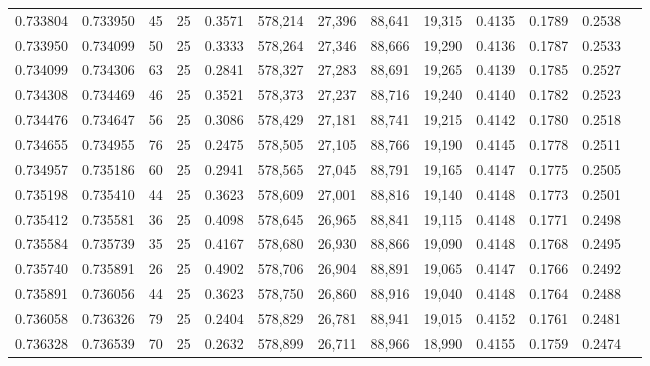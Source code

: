 \begin{tabular}{rrrrrrrrrrrrr}
0.733804 & 0.733950 &    45 &  25 &                                     0.3571 & 578,214 &  27,396 &  88,641 &  19,315 & 0.4135 & 0.1789 & 0.2538 \\
0.733950 & 0.734099 &    50 &  25 &                                     0.3333 & 578,264 &  27,346 &  88,666 &  19,290 & 0.4136 & 0.1787 & 0.2533 \\
0.734099 & 0.734306 &    63 &  25 &                                     0.2841 & 578,327 &  27,283 &  88,691 &  19,265 & 0.4139 & 0.1785 & 0.2527 \\
0.734308 & 0.734469 &    46 &  25 &                                     0.3521 & 578,373 &  27,237 &  88,716 &  19,240 & 0.4140 & 0.1782 & 0.2523 \\
0.734476 & 0.734647 &    56 &  25 &                                     0.3086 & 578,429 &  27,181 &  88,741 &  19,215 & 0.4142 & 0.1780 & 0.2518 \\
0.734655 & 0.734955 &    76 &  25 &                                     0.2475 & 578,505 &  27,105 &  88,766 &  19,190 & 0.4145 & 0.1778 & 0.2511 \\
0.734957 & 0.735186 &    60 &  25 &                                     0.2941 & 578,565 &  27,045 &  88,791 &  19,165 & 0.4147 & 0.1775 & 0.2505 \\
0.735198 & 0.735410 &    44 &  25 &                                     0.3623 & 578,609 &  27,001 &  88,816 &  19,140 & 0.4148 & 0.1773 & 0.2501 \\
0.735412 & 0.735581 &    36 &  25 &                                     0.4098 & 578,645 &  26,965 &  88,841 &  19,115 & 0.4148 & 0.1771 & 0.2498 \\
0.735584 & 0.735739 &    35 &  25 &                                     0.4167 & 578,680 &  26,930 &  88,866 &  19,090 & 0.4148 & 0.1768 & 0.2495 \\
0.735740 & 0.735891 &    26 &  25 &                                     0.4902 & 578,706 &  26,904 &  88,891 &  19,065 & 0.4147 & 0.1766 & 0.2492 \\
0.735891 & 0.736056 &    44 &  25 &                                     0.3623 & 578,750 &  26,860 &  88,916 &  19,040 & 0.4148 & 0.1764 & 0.2488 \\
0.736058 & 0.736326 &    79 &  25 &                                     0.2404 & 578,829 &  26,781 &  88,941 &  19,015 & 0.4152 & 0.1761 & 0.2481 \\
0.736328 & 0.736539 &    70 &  25 &                                     0.2632 & 578,899 &  26,711 &  88,966 &  18,990 & 0.4155 & 0.1759 & 0.2474 \\

\end{tabular}

